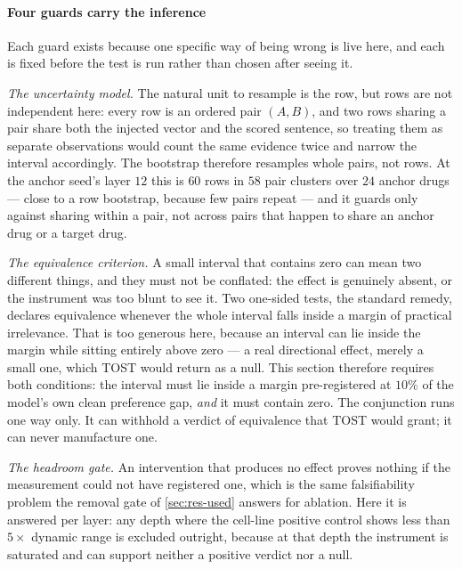 \paragraph{Four guards carry the inference} Each guard exists because one
specific way of being wrong is live here, and each is fixed before the test is
run rather than chosen after seeing it.

\emph{The uncertainty model.} The natural unit to resample is the row, but rows
are not independent here: every row is an ordered pair $(A,B)$, and two rows
sharing a pair share both the injected vector and the scored sentence, so
treating them as separate observations would count the same evidence twice and
narrow the interval accordingly. The bootstrap therefore resamples whole pairs,
not rows. At the anchor seed's layer $12$ this is $60$ rows in
$58$ pair clusters over $24$ anchor drugs --- close to a row bootstrap, because
few pairs repeat --- and it guards only against sharing within a pair, not
across pairs that happen to share an anchor drug or a target drug.

\emph{The equivalence criterion.} A small interval that contains zero can mean
two different things, and they must not be conflated: the effect is genuinely
absent, or the instrument was too blunt to see it. Two one-sided tests, the
standard remedy, declares equivalence whenever the whole interval falls inside a
margin of practical irrelevance. That is too
generous here, because an interval can lie inside the margin while sitting
entirely above zero --- a real directional effect, merely a small one, which
TOST would return as a null. This section therefore requires both conditions:
the interval must lie inside a margin pre-registered at $10\%$ of the model's
own clean preference gap, \emph{and} it must contain zero. The conjunction runs
one way only. It can withhold a verdict of equivalence that TOST would grant; it
can never manufacture one.

\emph{The headroom gate.} An intervention that produces no effect proves nothing
if the measurement could not have registered one, which is the same
falsifiability problem the removal gate of \cref{sec:res-used} answers for
ablation. Here it is answered per layer: any depth where the cell-line positive
control shows less than $5\times$ dynamic range is excluded outright, because at
that depth the instrument is saturated and can support neither a positive
verdict nor a null.

